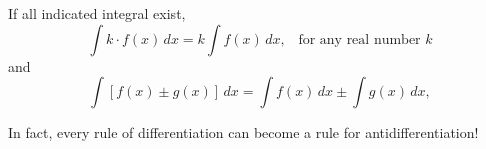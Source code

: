 \documentclass{book}
\begin{document}
\begin{Prop} If all indicated integral exist, \[\int k\cdot f(x)\,dx = k\int f(x)\,dx, \;\;\;\mbox{for any real number $k$}\] and \[\int [f(x)\pm g(x)]\, dx = \int f(x)\,dx \pm \int g(x)\,dx,\]\end{Prop}\vs


In fact, every rule of differentiation can become a rule for antidifferentiation!
\end{document}
